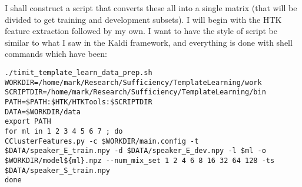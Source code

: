 \documentclass{article}
\begin{document}
I shall construct a script that converts these all into a single matrix (that will be divided to get training and development subsets).
I will begin with the HTK feature extraction followed by my own.  I want to have the style of script be similar to what I saw in the 
Kaldi framework, and everything is done with shell commands which have been:
\begin{verbatim}
./timit_template_learn_data_prep.sh
WORKDIR=/home/mark/Research/Sufficiency/TemplateLearning/work
SCRIPTDIR=/home/mark/Research/Sufficiency/TemplateLearning/bin
PATH=$PATH:$HTK/HTKTools:$SCRIPTDIR
DATA=$WORKDIR/data
export PATH
for ml in 1 2 3 4 5 6 7 ; do
CClusterFeatures.py -c $WORKDIR/main.config -t $DATA/speaker_E_train.npy -d $DATA/speaker_E_dev.npy -l $ml -o $WORKDIR/model${ml}.npz --num_mix_set 1 2 4 6 8 16 32 64 128 -ts $DATA/speaker_S_train.npy
done
\end{verbatim}
\end{document}
